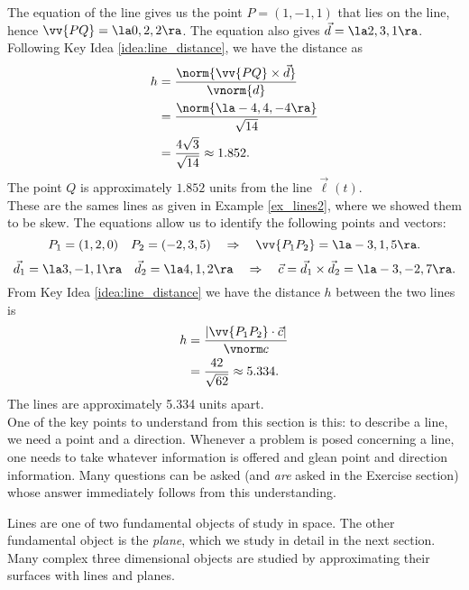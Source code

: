 {The equation of the line gives us the point $P=(1,-1,1)$ that lies on the line, hence $\vv{PQ} = \la 0,2,2\ra$. The equation also gives $\vec d= \la 2,3,1\ra$. Following Key Idea \ref{idea:line_distance}, we have the distance as 
\begin{align*}
h &= \frac{\norm{\vv{PQ}\times \vec d}}{\vnorm{d}}\\
	&= \frac{\norm{\la -4,4,-4\ra}}{\sqrt{14}}\\
	&=\frac{4\sqrt{3}}{\sqrt{14}} \approx 1.852.
\end{align*}
The point $Q$ is approximately $1.852$ units from the line $\vec\ell(t)$.
}\\

{These are the sames lines as given in Example \ref{ex_lines2}, where we showed them to be skew. The equations allow us to identify the following points and vectors:
$$P_1 = (1,2,0)\quad P_2 = (-2,3,5) \quad \Rightarrow \quad \vv{P_1P_2} = \la -3,1,5\ra.$$
$$\vec d_1 = \la 3,-1,1\ra \quad \vec d_2 = \la 4,1,2\ra \quad \Rightarrow \quad \vec c = \vec d_1\times \vec d_2 = \la -3,-2,7\ra.$$
From Key Idea \ref{idea:line_distance} we have the distance $h$ between the two lines is
\begin{align*}
h &= \frac{|\vv{P_1P_2}\cdot \vec c|}{\vnorm c}\\
&=\frac{42}{\sqrt{62}} \approx 5.334.
\end{align*}
The lines are approximately 5.334 units apart.
}\\

One of the key points to understand from this section is this: to describe a line, we need a point and a direction. Whenever a problem is posed concerning a line, one  needs to take whatever information is offered and glean point and direction information. Many questions can be asked (and \emph{are} asked in the Exercise section) whose answer immediately follows from this understanding. 

Lines are one of two fundamental objects of study in space. The other fundamental object is the \emph{plane}, which we study in detail in the next section. Many complex three dimensional objects are studied by approximating their surfaces with lines and planes.





